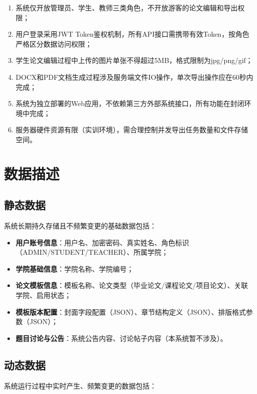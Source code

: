 \documentclass{../softeng}
\begin{document}
\begin{enumerate}
    \item 系统仅开放管理员、学生、教师三类角色，不开放游客的论文编辑和导出权限；
    \item 用户登录采用JWT Token鉴权机制，所有API接口需携带有效Token，按角色严格区分数据访问权限；
    \item 学生论文编辑过程中上传的图片单张不得超过5MB，格式限制为jpg/png/gif；
    \item DOCX和PDF文档生成过程涉及服务端文件IO操作，单次导出操作应在60秒内完成；
    \item 系统为独立部署的Web应用，不依赖第三方外部系统接口，所有功能在封闭环境中完成；
    \item 服务器硬件资源有限（实训环境），需合理控制并发导出任务数量和文件存储空间。
\end{enumerate}

\section{数据描述}

\subsection{静态数据}

系统长期持久存储且不频繁变更的基础数据包括：

\begin{itemize}
    \item \textbf{用户账号信息}：用户名、加密密码、真实姓名、角色标识（ADMIN/STUDENT/TEACHER）、所属学院；
    \item \textbf{学院基础信息}：学院名称、学院编号；
    \item \textbf{论文模板信息}：模板名称、论文类型（毕业论文/课程论文/项目论文）、关联学院、启用状态；
    \item \textbf{模板版本配置}：封面字段配置（JSON）、章节结构定义（JSON）、排版格式参数（JSON）；
    \item \textbf{题目讨论与公告}：系统公告内容、讨论帖子内容（本系统暂不涉及）。
\end{itemize}

\subsection{动态数据}

系统运行过程中实时产生、频繁变更的数据包括：
\end{document}
